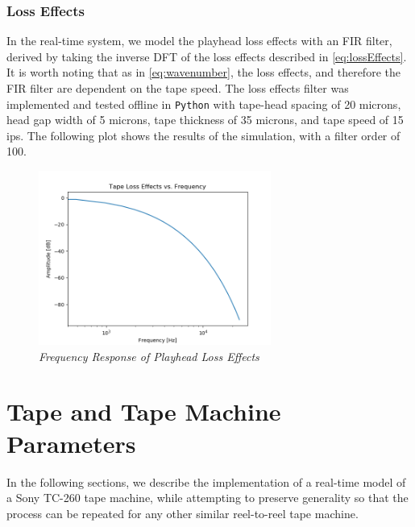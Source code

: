 \documentclass[twoside,a4paper]{article}
\begin{document}
\subsubsection{Loss Effects}
In the real-time system, we model the playhead
loss effects with an FIR filter, derived by
taking the inverse DFT of the
loss effects described in \cref{eq:lossEffects}.
It is worth noting that as in \cref{eq:wavenumber},
the loss effects, and therefore the FIR filter
are dependent on the tape speed.
\newline\newline
The loss effects filter was implemented and
tested offline in \texttt{Python} with tape-head 
spacing of 20 microns, head gap width of 5 microns, 
tape thickness of 35 microns, and tape speed of 15 ips.
The following plot shows the results of the simulation,
with a filter order of 100.
\begin{figure}[ht]
    \center
    \includegraphics[width=3in]{../Simulations/LossEffects/Loss_Effects.png}
    \caption{\label{lossEffectsSim}{\it Frequency Response of Playhead Loss Effects}}
\end{figure}
%

\section{Tape and Tape Machine Parameters}
In the following sections, we describe the implementation of
a real-time model of a Sony TC-260 tape machine, while attempting
to preserve generality so that the process can be repeated for any
other similar reel-to-reel tape machine.
\end{document}
